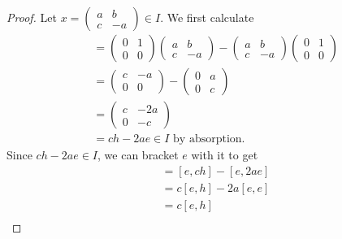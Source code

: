 \documentclass[12pt]{article}
\theoremstyle{definition}
\begin{document}
\begin{proof}
	Let $x = \begin{pmatrix}a & b \\ c & -a \end{pmatrix} \in I$.
	We first calculate \begin{align*}
		[e, x] & = \begin{pmatrix} 0 & 1 \\ 0 & 0 \end{pmatrix}\begin{pmatrix}a & b \\ c & -a\end{pmatrix} - \begin{pmatrix}a & b \\ c & -a\end{pmatrix}\begin{pmatrix} 0 & 1 \\ 0 & 0 \end{pmatrix} \\
		       & = \begin{pmatrix} c & -a \\ 0 & 0 \end{pmatrix} - \begin{pmatrix} 0 & a \\ 0 & c \end{pmatrix}                                                                                      \\
		       & = \begin{pmatrix} c & -2a \\ 0 & -c \end{pmatrix}                                                                                                                                   \\
		       & = ch - 2ae \in I \text{ by absorption}.
	\end{align*}
	Since $ch - 2ae \in I$, we can bracket $e$ with it to get \begin{align*}
		[e, ch - 2ae] & = [e, ch] - [e, 2ae]                                                                                                                                                                             \\
		              & = c[e, h] - 2a[e, e]                                                                                                                                                                             \\
		              & = c[e, h]                                                                                                                                                                                        \\

\end{align*}
\end{proof}
\end{document}
